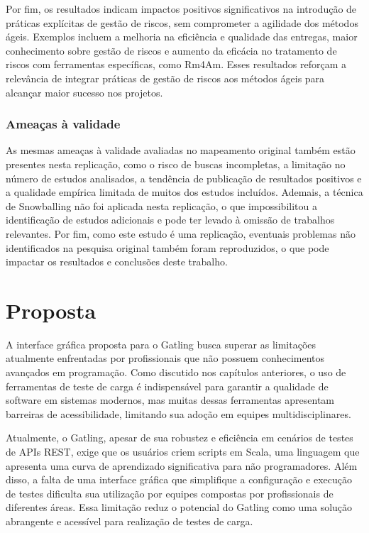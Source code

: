 \documentclass[
	12pt,
	openright,
	twoside,
	a4paper,
	english,
	brazil
	]{abntex2}
\begin{document}
Por fim, os resultados indicam impactos positivos significativos na introdução de práticas explícitas de gestão de riscos, sem comprometer a agilidade dos métodos ágeis. Exemplos incluem a melhoria na eficiência e qualidade das entregas, maior conhecimento sobre gestão de riscos e aumento da eficácia no tratamento de riscos com ferramentas específicas, como Rm4Am. Esses resultados reforçam a relevância de integrar práticas de gestão de riscos aos métodos ágeis para alcançar maior sucesso nos projetos.


\subsection{Ameaças à validade}

As mesmas ameaças à validade avaliadas no mapeamento original também estão presentes nesta replicação, como o risco de buscas incompletas, a limitação no número de estudos analisados, a tendência de publicação de resultados positivos e a qualidade empírica limitada de muitos dos estudos incluídos. Ademais, a técnica de Snowballing não foi aplicada nesta replicação, o que impossibilitou a identificação de estudos adicionais e pode ter levado à omissão de trabalhos relevantes. Por fim, como este estudo é uma replicação, eventuais problemas não identificados na pesquisa original também foram reproduzidos, o que pode impactar os resultados e conclusões deste trabalho.




\chapter{Proposta} %
A interface gráfica proposta para o Gatling busca superar as limitações atualmente enfrentadas por profissionais que não possuem conhecimentos avançados em programação. Como discutido nos capítulos anteriores, o uso de ferramentas de teste de carga é indispensável para garantir a qualidade de software em sistemas modernos, mas muitas dessas ferramentas apresentam barreiras de acessibilidade, limitando sua adoção em equipes multidisciplinares.

Atualmente, o Gatling, apesar de sua robustez e eficiência em cenários de testes de APIs REST, exige que os usuários criem scripts em Scala, uma linguagem que apresenta uma curva de aprendizado significativa para não programadores. Além disso, a falta de uma interface gráfica que simplifique a configuração e execução de testes dificulta sua utilização por equipes compostas por profissionais de diferentes áreas. Essa limitação reduz o potencial do Gatling como uma solução abrangente e acessível para realização de testes de carga.
\end{document}
